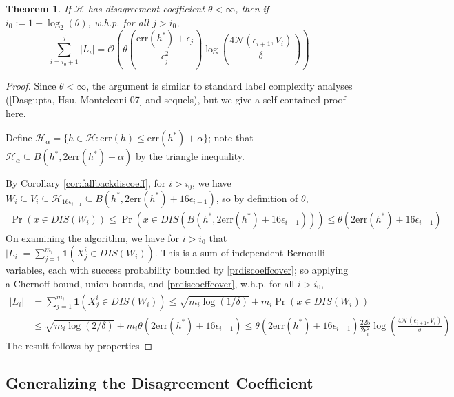\documentclass{article}[12pt]
\newtheorem{thm}{Theorem}%
\theoremstyle{named}
\DeclareMathOperator{\Prtxt}{Pr}
\newcommand{\ifn}{\mathbf{1}} %
\newcommand{\abs}[1]{\left| #1 \right|}
\newcommand{\prp}[2]{\Prtxt_{#2} \left(#1\right)}
\newcommand{\err}[1]{\mbox{err}\left(#1\right)}
\newcommand{\cH}{\mathcal{H}}
\newcommand{\cN}{\mathcal{N}}
\newcommand{\cO}[1]{\mathcal{O}\left(#1\right)}
\newcommand{\lrp}[1]{\left(#1\right)}
\begin{document}
\begin{thm}
If $\cH$ has disagreement coefficient $\theta < \infty$, then if $i_0 := 1 + \log_2 (\theta)$, w.h.p. for all $j > i_0$,
$$ \sum_{i = i_0+1}^j \abs{L_i} = \cO{ \theta \lrp{\frac{\err{h^*} + \epsilon_j}{\epsilon_j^2}} \log \lrp{\frac{4 \cN(\epsilon_{i+1}, V_i)}{\delta}} } $$
\end{thm}
\begin{proof}
Since $\theta < \infty$, the argument is similar 
to standard label complexity analyses ([Dasgupta, Hsu, Monteleoni 07] and sequels), 
but we give a self-contained proof here. 

Define $\cH_{\alpha} = \{ h \in \cH : \err{h} \leq \err{h^*} + \alpha \}$; 
note that $\cH_{\alpha} \subseteq B(h^*, 2 \err{h^*} + \alpha)$ by the triangle inequality. 

By Corollary \ref{cor:fallbackdiscoeff}, for $i > i_0$, 
we have $W_i \subseteq V_i \subseteq \cH_{16 \epsilon_{i-1}} \subseteq B(h^*, 2 \err{h^*} + 16 \epsilon_{i-1})$, 
so by definition of $\theta$,
\begin{align}
\label{prdiscoeffcover}
\prp{x \in DIS(W_i)}{} \leq \prp{x \in DIS(B(h^*, 2 \err{h^*} + 16 \epsilon_{i-1})) }{} \leq \theta (2 \err{h^*} + 16 \epsilon_{i-1})
\end{align}
On examining the algorithm, we have for $i > i_0$ that 
$ \abs{L_i} = \sum_{j=1}^{m_i} \ifn(X^i_j \in DIS(W_i))$. 
This is a sum of independent Bernoulli variables, 
each with success probability bounded by \eqref{prdiscoeffcover}; 
so applying a Chernoff bound, union bounds, and \eqref{prdiscoeffcover}, 
w.h.p. for all $i > i_0$,
\begin{align*}
\abs{L_i} &= \sum_{j=1}^{m_i} \ifn(X^i_j \in DIS(W_i)) \leq \sqrt{m_i \log(1/\delta)} + m_i \prp{x \in DIS(W_i)}{} \\
&\leq \sqrt{m_i \log(2/\delta)} + m_i \theta (2 \err{h^*} + 16 \epsilon_{i-1}) 
\leq \theta (2 \err{h^*} + 16 \epsilon_{i-1}) \frac{225}{2 \epsilon_i^2} \log \lrp{\frac{4 \cN(\epsilon_{i+1}, V_i)}{\delta}}
\end{align*}
The result follows by properties 
\end{proof}















\newpage
\subsection{Generalizing the Disagreement Coefficient}
\end{document}
